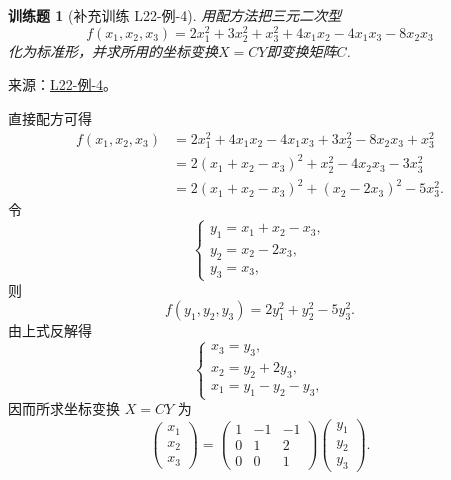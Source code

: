 \documentclass[12pt,fontset=fandol]{ctexart}
\newtheorem{exercise}{训练题}[section]
\begin{document}
\begin{exercise}[补充训练 L22-例-4]\label{prob:L22-例-4}
用配方法把三元二次型
    \[f(x_1,x_2,x_3)=2x_1^2+3x_2^2+x_3^2+4x_1x_2-4x_1x_3-8x_2x_3\]
    化为标准形，并求所用的坐标变换$X=CY$即变换矩阵$C$.
\end{exercise}
\noindent 来源：\href{https://github.com/yhwu-is/Linear-Algebra-Left-Undone/blob/new/%E8%AE%B2%E4%B9%89/%E4%B8%93%E9%A2%98/22%20%E4%BA%8C%E6%AC%A1%E5%9E%8B.tex}{L22-例-4}。
\begin{solve}
直接配方可得
    \begin{align*}
        f(x_1,x_2,x_3)
         & = 2x_1^2+4x_1x_2-4x_1x_3+3x_2^2-8x_2x_3+x_3^2 \\
         & = 2(x_1+x_2-x_3)^2+x_2^2-4x_2x_3-3x_3^2         \\
         & = 2(x_1+x_2-x_3)^2+(x_2-2x_3)^2-5x_3^2.
    \end{align*}
    令
    \[
        \begin{cases}
            y_1 = x_1+x_2-x_3, \\
            y_2 = x_2-2x_3,    \\
            y_3 = x_3,
        \end{cases}
    \]
    则
    \[
        f(y_1,y_2,y_3)=2y_1^2+y_2^2-5y_3^2.
    \]
    由上式反解得
    \[
        \begin{cases}
            x_3 = y_3,             \\
            x_2 = y_2+2y_3,        \\
            x_1 = y_1-y_2-y_3,
        \end{cases}
    \]
    因而所求坐标变换 $X=CY$ 为
    \[
        \begin{pmatrix}
            x_1 \\
            x_2 \\
            x_3
        \end{pmatrix}
        =
        \begin{pmatrix}
            1 & -1 & -1 \\
            0 & 1 & 2   \\
            0 & 0 & 1
        \end{pmatrix}
        \begin{pmatrix}
            y_1 \\
            y_2 \\
            y_3
        \end{pmatrix}.
    \]
\end{solve}
\end{document}
